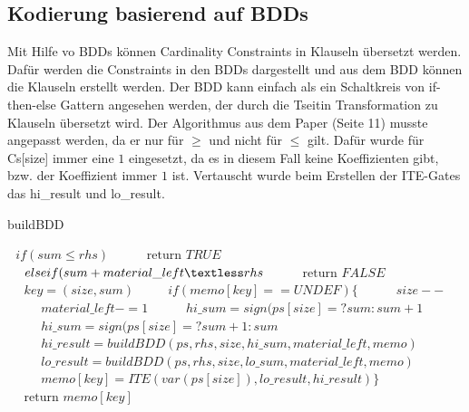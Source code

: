 \documentclass[a4,abstract=on]{scrartcl}
\begin{document}
	\subsection{Kodierung basierend auf BDDs}
Mit Hilfe vo BDDs können Cardinality Constraints in Klauseln übersetzt werden. Dafür werden die Constraints in den BDDs dargestellt und aus dem BDD können die Klauseln erstellt werden. Der BDD kann einfach als ein Schaltkreis von if-then-else Gattern angesehen werden, der durch die Tseitin Transformation zu Klauseln übersetzt wird. Der Algorithmus aus dem Paper \cite[][]{niklasse} (Seite 11) musste angepasst werden, da er nur für $\geq$ und nicht für $\leq$ gilt. Dafür wurde für Cs[size] immer eine $1$ eingesetzt, da es in diesem Fall keine Koeffizienten gibt, bzw. der Koeffizient immer $1$ ist. Vertauscht wurde beim Erstellen der ITE-Gates das hi\_result und lo\_result.\\

\begin{algorithm}
\caption{buildBDD}
\label{alg:buildBDD}
\begin{algorithmic}

\State $\text{~~}if (sum \leq rhs)$
\State $\text{~~~~~~~~return } TRUE$
\State $\text{~~~~}else if (sum + material\_left \textless rhs$
\State $\text{~~~~~~~~return } FALSE$
\State $\text{~~~~} key = (size, sum)$
\State $\text{~~~~~~ }if (memo[key] == UNDEF) \{$
\State $\text{~~~~~~~~} size--$
\State $\text{~~~~~~~~} material\_left -= 1$
\State $\text{~~~~~~~~} hi\_sum = sign(ps[size]= ? sum : sum + 1$
\State $\text{~~~~~~~~} hi\_sum = sign(ps[size]= ? sum + 1 : sum$
\State $\text{~~~~~~~~} hi\_result = buildBDD(ps , rhs, size, hi\_sum, material\_left, memo)$
\State $\text{~~~~~~~~} lo\_result = buildBDD(ps , rhs, size, lo\_sum, material\_left, memo)$
\State $\text{~~~~~~~~} memo[key] = ITE(var(ps[size]), lo\_result, hi\_result)\}$
\State $\text{~~~~return }memo[key]$
\end{algorithmic}
\end{algorithm}
\end{document}
